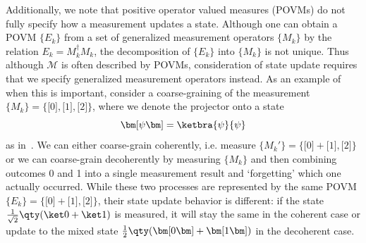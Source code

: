 \documentclass[%
 reprint,
superscriptaddress,
nofootinbib,
 amsmath,amssymb,
 prx, 
 accepted=2019-09-27,
]{quantumarticle}
\newcommand{\proj}[1]{{\bm[}#1{\bm]}}
\begin{document}
Additionally, we note that positive operator valued measures (POVMs)
do not fully specify how a measurement updates a state. Although one
can obtain a POVM $\{E_k\}$ from a set of generalized measurement
operators $\{M_k\}$ by the relation $E_k=M_k^\dag M_k$, the
decomposition of $\{E_k\}$ into $\{M_k\}$ is not unique.  Thus
although $\mathcal M$ is often described by POVMs, consideration of
state update requires that we specify generalized measurement
operators instead. As an example of when this is important, consider a
coarse-graining of the measurement $\{M_k\}=\{\proj0,\proj1,\proj2\}$,
where we denote the projector onto a state
\begin{equation}
  \proj\psi=\ketbra{\psi}{\psi}\label{eq:14}
\end{equation}
as in~\cite{Leiferquantumstatereal2014}. We can either coarse-grain
coherently, i.e. measure $\{M_k'\}=\{\proj0+\proj1,\proj2\}$ or we can
coarse-grain decoherently by measuring $\{M_k\}$ and then combining
outcomes 0 and 1 into a single measurement result and `forgetting'
which one actually occurred. While these two processes are represented
by the same POVM $\{E_k\}=\{\proj0+\proj1,\proj2\}$, their state
update behavior is different: if the state
$\frac{1}{\sqrt{2}}\qty(\ket0+\ket1)$ is measured, it will stay the
same in the coherent case or update to the mixed state
$\frac{1}{2}\qty(\proj0+\proj1)$ in the decoherent case.
\end{document}
